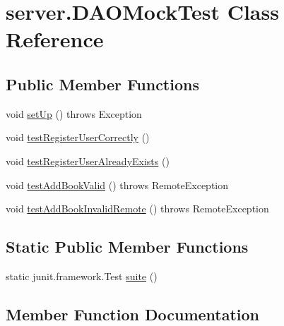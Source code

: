 \hypertarget{classserver_1_1_d_a_o_mock_test}{}\section{server.\+D\+A\+O\+Mock\+Test Class Reference}
\label{classserver_1_1_d_a_o_mock_test}
\subsection*{Public Member Functions}
\begin{DoxyCompactItemize}
\item 
void \hyperlink{classserver_1_1_d_a_o_mock_test_a4043bb7c119e734aec6a995cdcace7e2}{set\+Up} ()  throws Exception 
\item 
void \hyperlink{classserver_1_1_d_a_o_mock_test_a25088a79f562d82b1e09deb3c8d62fab}{test\+Register\+User\+Correctly} ()
\item 
void \hyperlink{classserver_1_1_d_a_o_mock_test_acb2d8f72de99513b776086c9cac2e481}{test\+Register\+User\+Already\+Exists} ()
\item 
void \hyperlink{classserver_1_1_d_a_o_mock_test_aa4be8a06f98d4fd2552b4ef073e5c3dc}{test\+Add\+Book\+Valid} ()  throws Remote\+Exception 
\item 
void \hyperlink{classserver_1_1_d_a_o_mock_test_aea6b337ba88d2f58d7ca05e61d7d8aaa}{test\+Add\+Book\+Invalid\+Remote} ()  throws Remote\+Exception 
\end{DoxyCompactItemize}
\subsection*{Static Public Member Functions}
\begin{DoxyCompactItemize}
\item 
static junit.\+framework.\+Test \hyperlink{classserver_1_1_d_a_o_mock_test_a1b414b7605772f324622e605a8f7768f}{suite} ()
\end{DoxyCompactItemize}


\subsection{Member Function Documentation}
\mbox{\label{classserver_1_1_d_a_o_mock_test_a4043bb7c119e734aec6a995cdcace7e2}} 
